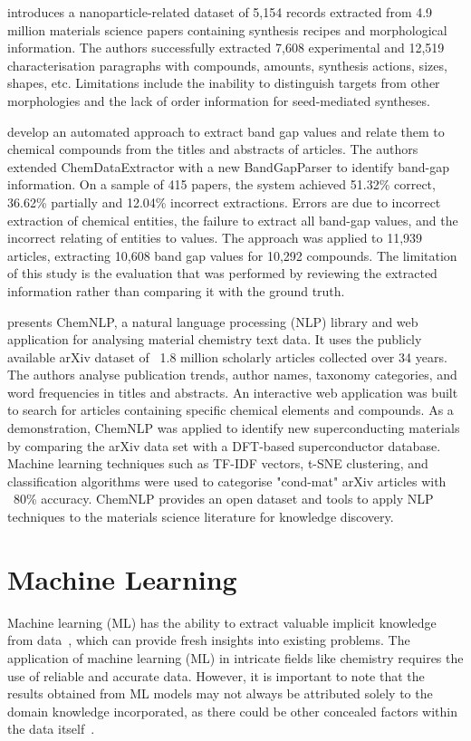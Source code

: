 \cite{cruse2022text} introduces a nanoparticle-related dataset of 5,154 records extracted from 4.9 million materials science papers containing synthesis recipes and morphological information.
The authors successfully extracted 7,608 experimental and 12,519 characterisation paragraphs with compounds, amounts, synthesis actions, sizes, shapes, etc.
Limitations include the inability to distinguish targets from other morphologies and the lack of order information for seed-mediated syntheses.

\cite{ghosh2022band} develop an automated approach to extract band gap values and relate them to chemical compounds from the titles and abstracts of articles.
The authors extended ChemDataExtractor with a new BandGapParser to identify band-gap information.
On a sample of 415 papers, the system achieved 51.32\% correct, 36.62\% partially and 12.04\% incorrect extractions.
Errors are due to incorrect extraction of chemical entities, the failure to extract all band-gap values, and the incorrect relating of entities to values.
The approach was applied to 11,939 articles, extracting 10,608 band gap values for 10,292 compounds.
The limitation of this study is the evaluation that was performed by reviewing the extracted information rather than comparing it with the ground truth.

\cite{choudhary2023chemnlp} presents ChemNLP, a natural language processing (NLP) library and web application for analysing material chemistry text data.
It uses the publicly available arXiv dataset of ~1.8 million scholarly articles collected over 34 years.
The authors analyse publication trends, author names, taxonomy categories, and word frequencies in titles and abstracts.
An interactive web application was built to search for articles containing specific chemical elements and compounds.
As a demonstration, ChemNLP was applied to identify new superconducting materials by comparing the arXiv data set with a DFT-based superconductor database.
Machine learning techniques such as TF-IDF vectors, t-SNE clustering, and classification algorithms were used to categorise "cond-mat" arXiv articles with ~80\% accuracy.
ChemNLP provides an open dataset and tools to apply NLP techniques to the materials science literature for knowledge discovery.

\section{Machine Learning}

Machine learning (ML) has the ability to extract valuable implicit knowledge from data~\cite{keith2021combining}, which can provide fresh insights into existing problems.
The application of machine learning (ML) in intricate fields like chemistry requires the use of reliable and accurate data. 
However, it is important to note that the results obtained from ML models may not always be attributed solely to the domain knowledge incorporated, as there could be other concealed factors within the data itself~\cite{keith2021combining}.

